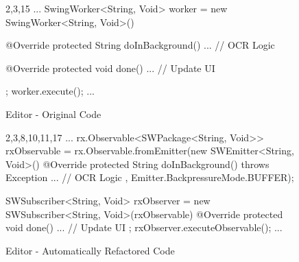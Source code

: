 \begin{figure}[H]
\begin{minipage}{0.45\textwidth}
\begin{sourcecode}
\begin{javacode}{2,3,15}
...
SwingWorker<String, Void> worker = 
	new SwingWorker<String, Void>() {

    @Override
    protected String doInBackground() {
        ... // OCR Logic
    }

    @Override
    protected void done() {
		... // Update UI
    }
};
worker.execute();
...
\end{javacode}
\caption{Editor - Original Code}
\label{code:example-editor-original}
\end{sourcecode}
\end{minipage}\hspace{0.7cm}
\begin{minipage}{0.51\textwidth}
\begin{sourcecode}
\begin{javacode}{2,3,8,10,11,17}
...
rx.Observable<SWPackage<String, Void>> rxObservable = 
	rx.Observable.fromEmitter(new SWEmitter<String, Void>(){
	@Override
	protected String doInBackground() throws Exception {
		... // OCR Logic
	}
}, Emitter.BackpressureMode.BUFFER);

SWSubscriber<String, Void> rxObserver = 
	new SWSubscriber<String, Void>(rxObservable) {
	@Override
	protected void done() {
		... // Update UI
	}
};
rxObserver.executeObservable();
...
\end{javacode}
\caption{Editor - Automatically Refactored Code}
\label{code:example-editor-refactored}
\end{sourcecode}
\end{minipage}
\end{figure}